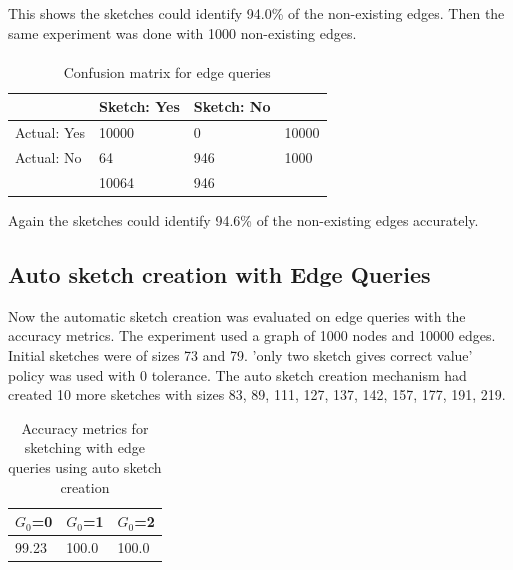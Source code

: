 \documentclass[12pt]{report}
\numberwithin{figure}{section}
\numberwithin{table}{section}
\begin{document}
This shows the sketches could identify 94.0\% of the non-existing edges. Then the same experiment was  done with 1000 non-existing edges.

\paragraph{}

\begin{table}[H]
\centering
\begin{tabular}{l|l|l|l}
\cline{2-3}
                                  & Sketch: Yes & Sketch: No &                            \\ \hline
\multicolumn{1}{|l|}{Actual: Yes} & 10000       & 0          & \multicolumn{1}{l|}{10000} \\ \hline
\multicolumn{1}{|l|}{Actual: No}  & 64          & 946        & \multicolumn{1}{l|}{1000}  \\ \hline
                                  & 10064       & 946        &                            \\ \cline{2-3}
\end{tabular}
\caption{Confusion matrix for edge queries}
\end{table}

Again the sketches could identify 94.6\% of the non-existing edges accurately.


\subsection{Auto sketch creation with Edge Queries}

Now the automatic sketch creation was evaluated on edge queries with the accuracy metrics. The experiment used a graph of 1000 nodes and 10000 edges. Initial sketches were of sizes 73 and 79. 'only two sketch gives correct value' policy was used with 0 tolerance. The auto sketch creation mechanism had created 10 more sketches with sizes 83, 89, 111, 127, 137, 142, 157, 177, 191, 219.

\begin{table}[H]
\centering
\begin{tabular}{|l|l|l|}
\hline
$G_0$=0 & $G_0$=1 & $G_0$=2 \\ \hline
99.23  &   100.0  &   100.0\\ \hline
\end{tabular}
\caption{Accuracy metrics for sketching with edge queries using auto sketch creation}
\end{table}
\end{document}
